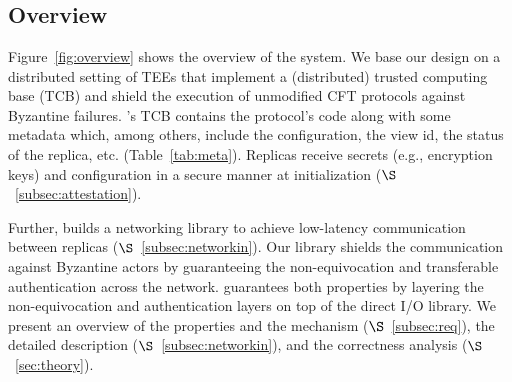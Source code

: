 \section{\projecttitle{}}
\label{sec:design}





\subsection{Overview}
Figure~\ref{fig:overview} shows the overview of the \projecttitle{} system.  We base our design on a distributed setting of TEEs that implement a (distributed) trusted computing base (TCB) and shield the execution of unmodified CFT protocols against Byzantine failures. \projecttitle{}'s TCB contains the protocol's code along with some metadata which, among others, include the configuration, the view id, the status of the replica, etc. (Table~\ref{tab:meta}). Replicas receive secrets (e.g., encryption keys) and configuration in a secure manner at initialization ($\S$~\ref{subsec:attestation}).

Further, \projecttitle{} builds a networking library to achieve low-latency communication between replicas ($\S$~\ref{subsec:networkin}). Our library shields the communication against Byzantine actors by guaranteeing the non-equivocation and transferable authentication across the network. \projecttitle{} guarantees both properties by layering the non-equivocation and authentication layers on top of the direct I/O library. We present an overview of the properties and the mechanism ($\S$~\ref{subsec:req}), the detailed description ($\S$~\ref{subsec:networkin}), and the correctness analysis ($\S$~\ref{sec:theory}).




